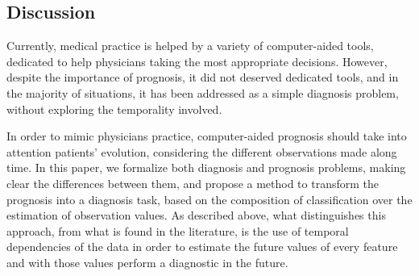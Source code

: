 


\subsection{Discussion}
\label{subsection:discussion}

Currently, medical practice is helped by a variety of computer-aided tools, dedicated to help physicians taking the most
 appropriate decisions. However, despite the importance of prognosis, it did not deserved dedicated tools, and in the majority 
 of situations, it has been addressed as a simple diagnosis problem, without exploring the temporality involved.

In order to mimic physicians practice, computer-aided prognosis should take into attention patients’ evolution, considering the 
different observations made along time. In this paper, we formalize both diagnosis and prognosis problems, making clear the
 differences between them, and propose a method to transform the prognosis into a diagnosis task, based on the composition
 of classification over the estimation of observation values. As described above, what distinguishes this approach, from what 
 is found in the literature, is the use of temporal dependencies of the data in order to estimate the future values of every 
 feature and with those values perform a diagnostic in the future. 
 
 
\cleardoublepage
